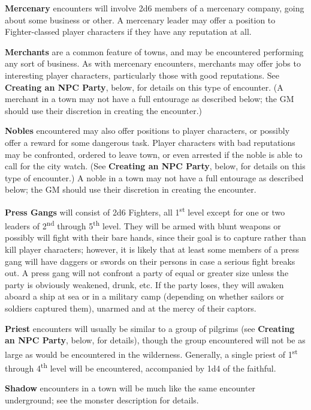 \documentclass[a4paper,twoside,openany,10pt]{book}
\begin{document}
\begin{multicols}{2}
\textbf{Mercenary} encounters will involve 2d6 members of a mercenary company, going about some business or other. A mercenary leader may offer a position to Fighter-classed player characters if they have any reputation at all.

\textbf{Merchants} are a common feature of towns, and may be encountered performing any sort of business. As with mercenary encounters, merchants may offer jobs to interesting player characters, particularly those with good reputations. See \textbf{Creating an NPC Party}, below, for details on this type of encounter. (A merchant in a town may not have a full entourage as described below; the GM should use their discretion in creating the encounter.)

\textbf{Nobles} encountered may also offer positions to player characters, or possibly offer a reward for some dangerous task. Player characters with bad reputations may be confronted, ordered to leave town, or even arrested if the noble is able to call for the city watch. (See \textbf{Creating an NPC Party}, below, for details on this type of encounter.) A noble in a town may not have a full entourage as described below; the GM should use their discretion in creating the encounter.

\textbf{Press Gangs} will consist of 2d6 Fighters, all 1\textsuperscript{st} level except for one or two leaders of 2\textsuperscript{nd} through 5\textsuperscript{th} level. They will be armed with blunt weapons or possibly will fight with their bare hands, since their goal is to capture rather than kill player characters; however, it is likely that at least some members of a press gang will have daggers or swords on their persons in case a serious fight breaks out. A press gang will not confront a party of equal or greater size unless the party is obviously weakened, drunk, etc. If the party loses, they will awaken aboard a ship at sea or in a military camp (depending on whether sailors or soldiers captured them), unarmed and at the mercy of their captors.

\textbf{Priest} encounters will usually be similar to a group of pilgrims (see \textbf{Creating an NPC Party}, below, for details), though the group encountered will not be as large as would be encountered in the wilderness. Generally, a single priest of 1\textsuperscript{st} through 4\textsuperscript{th} level will be encountered, accompanied by 1d4 of the faithful. 

\textbf{Shadow} encounters in a town will be much like the same encounter underground; see the monster description for details.


\end{multicols}
\end{document}
